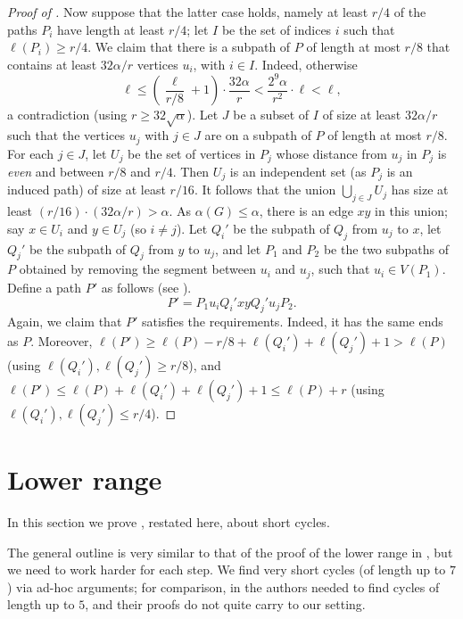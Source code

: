 \documentclass[11pt,english]{article}
\theoremstyle{plain}
\theoremstyle{definition}
\theoremstyle{remark}
\begin{document}
\begin{proof}[Proof of ]
			Now suppose that the latter case holds, namely at least $r/4$ of the paths $P_i$ have length at least $r/4$; let $I$ be the set of indices $i$ such that $\ell(P_i) \ge r/4$. We claim that there is a subpath of $P$ of length at most $r/8$ that contains at least $32\alpha/r$ vertices $u_i$, with $i \in I$.
			Indeed, otherwise
			\begin{equation*}
				\ell \le \left(\frac{\ell}{r/8} + 1\right) \cdot \frac{32\alpha}{r}
				< \frac{2^{9}\alpha}{r^2} \cdot \ell
				< \ell, 
			\end{equation*}
			a contradiction (using $r \ge 32\sqrt{\alpha}$).
			Let $J$ be a subset of $I$ of size at least $32\alpha/r$ such that the vertices $u_j$ with $j \in J$ are on a subpath of $P$ of length at most $r/8$. 
			For each $j \in J$, let $U_j$ be the set of vertices in $P_j$ whose distance from $u_j$ in $P_j$ is \emph{even} and between $r/8$ and $r/4$. Then $U_j$ is an independent set (as $P_j$ is an induced path) of size at least $r/16$. It follows that the union $\bigcup_{j \in J}U_j$ has size at least $(r/16) \cdot (32\alpha/r) > \alpha$. As $\alpha(G) \le \alpha$, there is an edge $xy$ in this union; say $x \in U_i$ and $y \in U_j$ (so $i \neq j$). Let $Q_i'$ be the subpath of $Q_j$ from $u_j$ to $x$, let $Q_j'$ be the subpath of $Q_j$ from $y$ to $u_j$, and let $P_1$ and $P_2$ be the two subpaths of $P$ obtained by removing the segment between $u_i$ and $u_j$, such that $u_i \in V(P_1)$. 
			Define a path $P'$ as follows (see ).
			\begin{equation*}
				P' = P_1 u_i Q_i' xy Q_j' u_j P_2.
			\end{equation*}
			Again, we claim that $P'$ satisfies the requirements. Indeed, it has the same ends as $P$. Moreover, $\ell(P') \ge \ell(P) - r/8 + \ell(Q_i') + \ell(Q_j') + 1 > \ell(P)$ (using $\ell(Q_i'), \ell(Q_j') \ge r/8$), and $\ell(P') \le \ell(P) + \ell(Q_i') + \ell(Q_j') + 1 \le \ell(P) + r$ (using $\ell(Q_i'), \ell(Q_j') \le r/4$).
		\end{proof}
\section{Lower range} \label{sec:lower}

	In this section we prove , restated here, about short cycles.
	\lemLowerRange*

	The general outline is very similar to that of the proof of the lower range in \cite{draganic2023chvatal}, but we need to work harder for each step.
	We find very short cycles (of length up to $7$) via ad-hoc arguments; for comparison, in \cite{draganic2023chvatal} the authors needed to find cycles of length up to $5$, and their proofs do not quite carry to our setting. 
\end{document}

